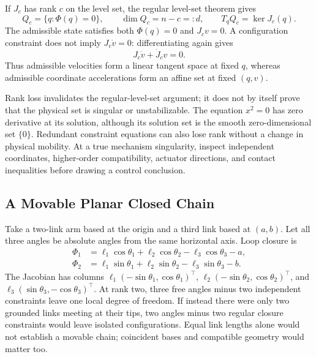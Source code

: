If $J_c$ has rank $c$ on the level set, the regular level-set theorem gives
\begin{equation}
 Q_c=\{q:\Phi(q)=0\},\qquad \dim Q_c=n-c=:d,\qquad T_qQ_c=\ker J_c(q).
 \label{eq:ch9:tangent-constraint}
\end{equation}
The admissible state satisfies both $\Phi(q)=0$ and $J_cv=0$. A configuration constraint does not imply $J_c\dot v=0$: differentiating again gives
\begin{equation}
 J_c\dot v+\dot J_cv=0.
 \label{eq:ch9:accel-constraint}
\end{equation}
Thus admissible velocities form a linear tangent space at fixed $q$, whereas admissible coordinate accelerations form an affine set at fixed $(q,v)$.

Rank loss invalidates the regular-level-set argument; it does not by itself prove that the physical set is singular or unstabilizable. The equation $x^2=0$ has zero derivative at its solution, although its solution set is the smooth zero-dimensional set $\{0\}$. Redundant constraint equations can also lose rank without a change in physical mobility. At a true mechanism singularity, inspect independent coordinates, higher-order compatibility, actuator directions, and contact inequalities before drawing a control conclusion.

\subsection{A Movable Planar Closed Chain}

Take a two-link arm based at the origin and a third link based at $(a,b)$. Let all three angles be absolute angles from the same horizontal axis. Loop closure is
\begin{align}
 \Phi_1&=\ell_1\cos\theta_1+\ell_2\cos\theta_2-\ell_3\cos\theta_3-a,\\
 \Phi_2&=\ell_1\sin\theta_1+\ell_2\sin\theta_2-\ell_3\sin\theta_3-b.
\end{align}
The Jacobian has columns $\ell_1(-\sin\theta_1,\cos\theta_1)^\top$, $\ell_2(-\sin\theta_2,\cos\theta_2)^\top$, and $\ell_3(\sin\theta_3,-\cos\theta_3)^\top$. At rank two, three free angles minus two independent constraints leave one local degree of freedom. If instead there were only two grounded links meeting at their tips, two angles minus two regular closure constraints would leave isolated configurations. Equal link lengths alone would not establish a movable chain; coincident bases and compatible geometry would matter too.

